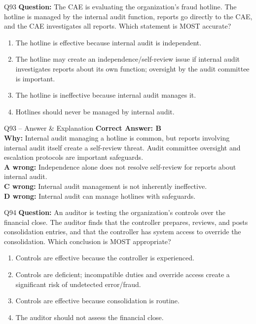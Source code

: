 \documentclass[aspectratio=169,10pt]{beamer}
\begin{document}
	\begin{frame}[t]{Q93}
		\small
		\textbf{Question:} The CAE is evaluating the organization's fraud hotline. The hotline is managed by the internal audit function, reports go directly to the CAE, and the CAE investigates all reports. Which statement is MOST accurate?
		\begin{enumerate}[label=\Alph*.,itemsep=1pt,topsep=2pt]
			\item The hotline is effective because internal audit is independent.
			\item The hotline may create an independence/self-review issue if internal audit investigates reports about its own function; oversight by the audit committee is important.
			\item The hotline is ineffective because internal audit manages it.
			\item Hotlines should never be managed by internal audit.
		\end{enumerate}
	\end{frame}
	
	\begin{frame}[t]{Q93 -- Answer \& Explanation}
		\small
		\textbf{Correct Answer: B} \\[4pt]
		\textbf{Why:} Internal audit managing a hotline is common, but reports involving internal audit itself create a self-review threat. Audit committee oversight and escalation protocols are important safeguards. \\[4pt]
		\textbf{A wrong:} Independence alone does not resolve self-review for reports about internal audit. \\[2pt]
		\textbf{C wrong:} Internal audit management is not inherently ineffective. \\[2pt]
		\textbf{D wrong:} Internal audit can manage hotlines with safeguards.
	\end{frame}
	
	\begin{frame}[t]{Q94}
		\small
		\textbf{Question:} An auditor is testing the organization's controls over the financial close. The auditor finds that the controller prepares, reviews, and posts consolidation entries, and that the controller has system access to override the consolidation. Which conclusion is MOST appropriate?
		\begin{enumerate}[label=\Alph*.,itemsep=1pt,topsep=2pt]
			\item Controls are effective because the controller is experienced.
			\item Controls are deficient; incompatible duties and override access create a significant risk of undetected error/fraud.
			\item Controls are effective because consolidation is routine.
			\item The auditor should not assess the financial close.
		\end{enumerate}
	\end{frame}
	
\end{document}
